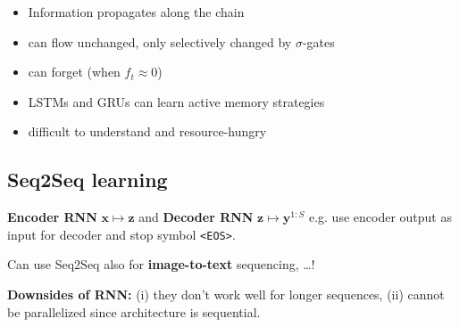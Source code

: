 \begin{itemize}
    \item Information propagates along the chain
    \item can flow unchanged, only selectively changed by $\sigma$-gates
    \item can forget (when $f_t \approx 0$)
    \item LSTMs and GRUs can learn active memory strategies
    \item difficult to understand and resource-hungry
\end{itemize}


\subsection{Seq2Seq learning}

\textbf{Encoder RNN} $\symbf x \mapsto \symbf z$ and
\textbf{Decoder RNN} $\symbf z \mapsto \symbf y^{1:S}$ e.g. use encoder output as input for decoder and stop symbol \texttt{<EOS>}.

Can use Seq2Seq also for \textbf{image-to-text} sequencing, \ldots!


\textbf{Downsides of RNN:} (i) they don't work well for longer sequences, (ii) cannot be parallelized since architecture is sequential.
